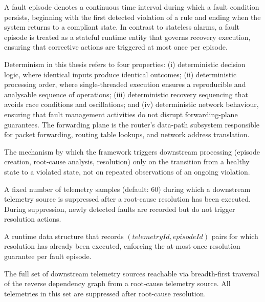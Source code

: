 \begin{definition}
A fault episode denotes a continuous time interval during which a fault condition persists, beginning with the first detected violation of a rule and ending when the system returns to a compliant state. In contrast to stateless alarms, a fault episode is treated as a stateful runtime entity that governs recovery execution, ensuring that corrective actions are triggered at most once per episode.
\end{definition}

\begin{definition}
Determinism in this thesis refers to four properties:
(i) deterministic decision logic, where identical inputs produce identical outcomes;
(ii) deterministic processing order, where single-threaded execution ensures a reproducible and analysable sequence of operations;
(iii) deterministic recovery sequencing that avoids race conditions and oscillations; and
(iv) deterministic network behaviour, ensuring that fault management activities do not disrupt forwarding-plane guarantees.
The forwarding plane is the router's data-path subsystem responsible for packet forwarding, routing table lookups, and network address translation.
\end{definition}

\begin{definition}
The mechanism by which the framework triggers downstream processing (episode creation, root-cause analysis, resolution) only on the transition from a healthy state to a violated state, not on repeated observations of an ongoing violation.
\end{definition}

\begin{definition}
A fixed number of telemetry samples (default: 60) during which a downstream telemetry source is suppressed after a root-cause resolution has been executed. During suppression, newly detected faults are recorded but do not trigger resolution actions.
\end{definition}

\begin{definition}
A runtime data structure that records $(telemetryId, episodeId)$ pairs for which resolution has already been executed, enforcing the at-most-once resolution guarantee per fault episode.
\end{definition}

\begin{definition}
The full set of downstream telemetry sources reachable via breadth-first traversal of the reverse dependency graph from a root-cause telemetry source. All telemetries in this set are suppressed after root-cause resolution.
\end{definition}